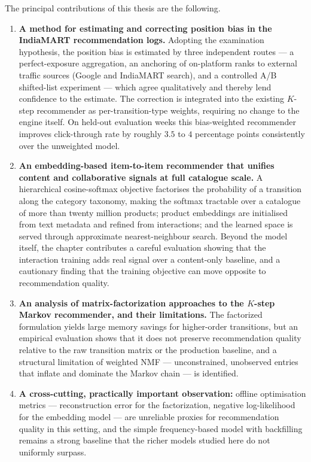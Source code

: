 The principal contributions of this thesis are the following.

\begin{enumerate}
  \item \textbf{A method for estimating and correcting position bias in the
        IndiaMART recommendation logs.} Adopting the examination hypothesis, the
        position bias is estimated by three independent routes --- a
        perfect-exposure aggregation, an anchoring of on-platform ranks to
        external traffic sources (Google and IndiaMART search), and a controlled
        A/B shifted-list experiment --- which agree qualitatively and thereby
        lend confidence to the estimate. The correction is integrated into the
        existing $K$-step recommender as per-transition-type weights, requiring no
        change to the engine itself. On held-out evaluation weeks this
        bias-weighted recommender improves click-through rate by roughly $3.5$ to
        $4$ percentage points consistently over the unweighted model.
  \item \textbf{An embedding-based item-to-item recommender that unifies content
        and collaborative signals at full catalogue scale.} A hierarchical
        cosine-softmax objective factorises the probability of a transition along
        the category taxonomy, making the softmax tractable over a catalogue of
        more than twenty million products; product embeddings are initialised from
        text metadata and refined from interactions; and the learned space is
        served through approximate nearest-neighbour search. Beyond the model
        itself, the chapter contributes a careful evaluation showing that the
        interaction training adds real signal over a content-only baseline, and a
        cautionary finding that the training objective can move opposite to
        recommendation quality.
  \item \textbf{An analysis of matrix-factorization approaches to the $K$-step
        Markov recommender, and their limitations.} The factorized formulation
        yields large memory savings for higher-order transitions, but an
        empirical evaluation shows that it does not preserve recommendation
        quality relative to the raw transition matrix or the production baseline,
        and a structural limitation of weighted NMF --- unconstrained,
        unobserved entries that inflate and dominate the Markov chain --- is
        identified.
  \item \textbf{A cross-cutting, practically important observation:} offline
        optimisation metrics --- reconstruction error for the factorization,
        negative log-likelihood for the embedding model --- are unreliable
        proxies for recommendation quality in this setting, and the simple
        frequency-based model with backfilling remains a strong baseline that the
        richer models studied here do not uniformly surpass.
\end{enumerate}


